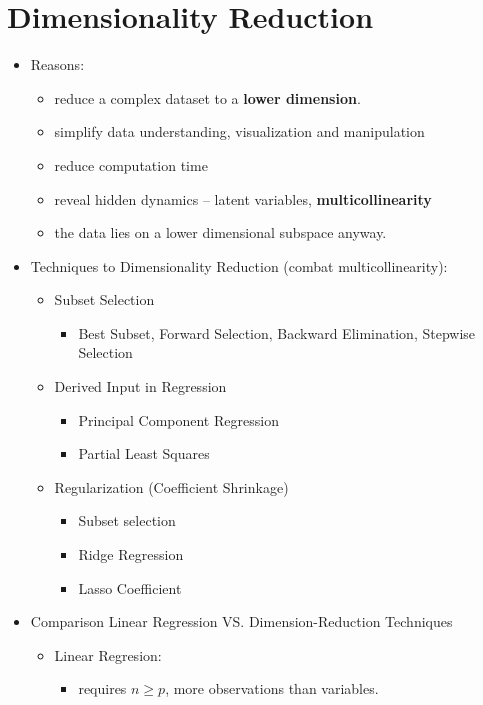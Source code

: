 \section{Dimensionality Reduction}
\begin{itemize}
	\item Reasons: 
	\begin{itemize}
		\item reduce a complex dataset to a \textbf{lower dimension}.
		\item simplify data understanding, visualization and manipulation
		\item reduce computation time
		\item reveal hidden dynamics -- latent variables, \textbf{multicollinearity}
		\item the data lies on a lower dimensional subspace anyway. 
	\end{itemize}

	\item Techniques to Dimensionality Reduction (combat multicollinearity):
	\begin{itemize}
		\item Subset Selection 
		\begin{itemize}
			\item Best Subset, Forward Selection, Backward Elimination, Stepwise Selection
		\end{itemize}
		\item Derived Input in Regression
		\begin{itemize}
			\item Principal Component Regression
			\item Partial Least Squares
		\end{itemize}
		\item Regularization (Coefficient Shrinkage)
		\begin{itemize}
			\item Subset selection
			\item Ridge Regression
			\item Lasso Coefficient
		\end{itemize}
	\end{itemize}
	
	\item Comparison Linear Regression VS. Dimension-Reduction Techniques
	\begin{itemize}
		\item Linear Regresion: 
		\begin{itemize}
			\item requires $n \geq p$, more observations than variables. 
			

\end{itemize}
\end{itemize}
\end{itemize}
